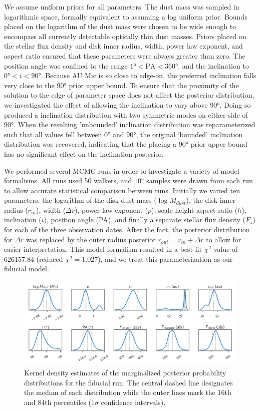 \documentclass[modern]{aastex62}
\begin{document}
We assume uniform priors for all parameters.
The dust mass was sampled in logarithmic space, formally equivalent to assuming a log uniform prior.
Bounds placed on the logarithm of the dust mass were chosen to be wide enough to encompass all currently detectable optically thin dust masses.
Priors placed on the stellar flux density and disk inner radius, width, power law exponent, and aspect ratio ensured that these parameters were always greater than zero.
The position angle was confined to the range $\ang{1} < \text{PA} < \ang{360}$, and the inclination to $\ang{0} < i < \ang{90}$.
Because AU Mic is so close to edge-on, the preferred inclination falls very close to the \ang{90} prior upper bound. 
To ensure that the proximity of the solution to the edge of parameter space does not affect the posterior distribution, we investigated the effect of allowing the inclination to vary above \ang{90}. 
Doing so produced a inclination distribution with two symmetric modes on either side of \ang{90}. 
When the resulting ’unbounded’ inclination distribution was reparameterized such that all values fell between \ang{0} and \ang{90}, the original ‘bounded’ inclination distribution was recovered, indicating that the placing a \ang{90} prior upper bound has no significant effect on the inclination posterior.

We performed several MCMC runs in order to investigate a variety of model formalisms. 
All runs used 50 walkers, and $10^5$ samples were drawn from each run to allow accurate statistical comparison between runs.
Initially we varied ten parameters: the logarithm of the disk dust mass ($\log M_{dust}$), the disk inner radius ($r_{in}$), width ($\Delta r$), power law exponent ($p$), scale height aspect ratio ($h$), inclination ($i$), position angle (PA), and finally a separate stellar flux density ($F_\star$) for each of the three observation dates. 
After the fact, the posterior distribution for $\Delta r$ was replaced by the outer radius posterior $r_{out} = r_{in} + \Delta r$ to allow for easier interpretation.
This model formalism resulted in a best-fit $\chi^2$ value of 626157.84 (reduced $\chi^2=1.027$), and we treat this parameterization as our fiducial model.

\begin{figure}
  \centering
  \includegraphics[width=\linewidth]{../figures/fiducial_kde}
  \caption{Kernel density estimates of the marginalized posterior probability distributions for the fiducial run. The central dashed line designates the median of each distribution while the outer lines mark the 16th and 84th percentiles ($1\sigma$ confidence intervals).}
  \label{fig: kde}
\end{figure}
\end{document}
